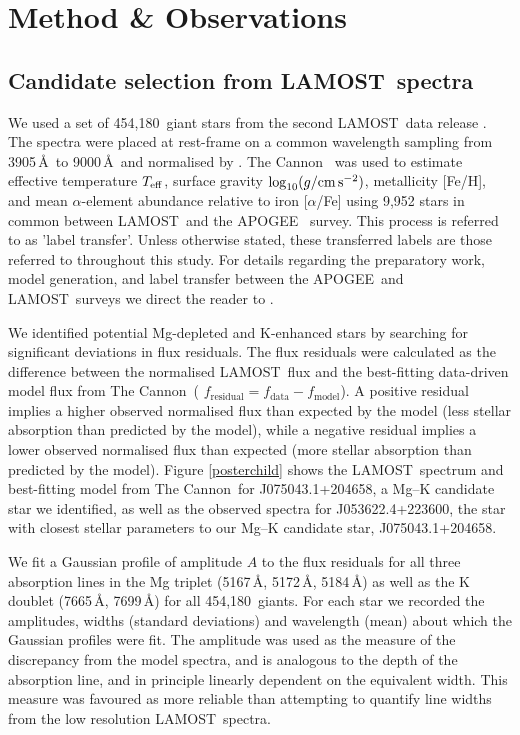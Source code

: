 \documentclass[a4paper,fleqn,usenatbib]{mnras}
\newcommand{\LamostGiants}{454,180}
\newcommand{\project}[1]{#1}
\newcommand{\lamost}{\project{LAMOST}}
\newcommand{\apogee}{\project{APOGEE}}
\newcommand{\tc}{\project{The Cannon}}
\newcommand{\teff}{T_{\rm eff}}
\newcommand{\logg}{\log_{10}(g/{\rm cm\,s}^{-2})}
\begin{document}
\section{Method \& Observations}
\label{sec:method}
\subsection{Candidate selection from \lamost\ spectra}
We used a set of \LamostGiants\ giant stars from the second \lamost\ data release \citep{luo2016vizier}. The spectra were placed at rest-frame on a common wavelength sampling from 3905\,\AA\ to 9000\,\AA\ and normalised by \citet{ho2017}. \tc\ \citep{ness2016,ho2017} was used to estimate effective temperature $\teff$, surface gravity $\logg$, metallicity [Fe/H], and mean $\alpha$-element abundance relative to iron [$\alpha$/Fe] using 9,952 stars in common between \lamost\ and the \apogee\ \citep{alam2015} survey. This process is referred to as 'label transfer'. Unless otherwise stated, these transferred labels are those referred to throughout this study. For details regarding the preparatory work, model generation, and label transfer between the \apogee\ and \lamost\ surveys we direct the reader to \citet{ho2017}. 

We identified potential Mg-depleted and K-enhanced stars by searching for significant deviations in flux residuals. The flux residuals were calculated as the difference between the normalised \lamost\ flux and the best-fitting data-driven model flux from \tc\ ( $f_{\textrm{residual}} = f_{\textrm{data}} - f_{\textrm{model}}$). A positive residual implies a higher observed normalised flux than expected by the model (less stellar absorption than predicted by the model), while a negative residual implies a lower observed normalised flux than expected (more stellar absorption than predicted by the model). Figure \ref{posterchild} shows the \lamost\ spectrum and best-fitting model from \tc\ for J075043.1+204658, a Mg--K candidate star we identified, as well as the observed spectra for J053622.4+223600, the star with closest stellar parameters to our Mg--K candidate star, J075043.1+204658. 

We fit a Gaussian profile of amplitude $A$ to the flux residuals for all three absorption lines in the Mg triplet (5167\,\AA, 5172\,\AA, 5184\,\AA) as well as the K doublet (7665\,\AA, 7699\,\AA) for all \LamostGiants\ giants. For each star we recorded the amplitudes, widths (standard deviations) and wavelength (mean) about which the Gaussian profiles were fit. The amplitude was used as the measure of the discrepancy from the model spectra, and is analogous to the depth of the absorption line, and in principle linearly dependent on the equivalent width. This measure was favoured as more reliable than attempting to quantify line widths from the low resolution \lamost\ spectra. %
\end{document}
